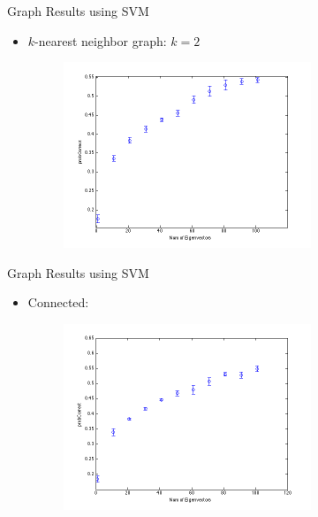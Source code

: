 \documentclass[xcolor=dvipsnames,t]{beamer} %
\begin{document}
\begin{frame}{Graph Results using SVM}
\begin{itemize}
\item $k$-nearest neighbor graph: $k=2$ 
\begin{figure}[h!]
  \centering
    \includegraphics[width=0.7\textwidth]{figures/plotopt2k2.png}
\end{figure}
\end{itemize}
\end{frame}
\begin{frame}{Graph Results using SVM}
\begin{itemize}
\item Connected:  
\begin{figure}[h!]
  \centering
    \includegraphics[width=0.7\textwidth]{figures/plotopt3.png}
\end{figure}
\end{itemize}
\end{frame}
\end{document}
